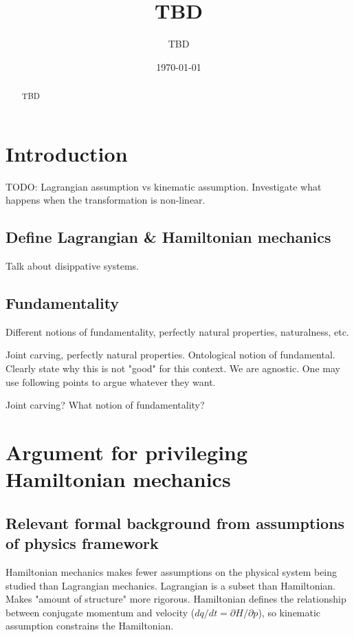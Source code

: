 \documentclass[letterpaper]{article}
\begin{document}
\title{TBD}
\author{TBD}

\date{\today}

\maketitle

\begin{abstract}
	TBD
\end{abstract}


\section{Introduction}


TODO: Lagrangian assumption vs kinematic assumption. Investigate what happens when the transformation is non-linear.

\subsection{Define Lagrangian \& Hamiltonian mechanics}

Talk about disippative systems.

\subsection{Fundamentality}

Different notions of fundamentality, perfectly natural properties, naturalness, etc. 

Joint carving, perfectly natural properties. Ontological notion of fundamental. Clearly state why this is not "good" for this context. We are agnostic. One may use following points to argue whatever they want.

Joint carving? What notion of fundamentality? 

\section{Argument for privileging Hamiltonian mechanics}

\subsection{Relevant formal background from assumptions of physics framework}

Hamiltonian mechanics makes fewer assumptions on the physical system being studied than Lagrangian mechanics. Lagrangian is a subset than Hamiltonian. Makes "amount of structure" more rigorous. Hamiltonian defines the relationship between conjugate momentum and velocity ($dq/dt = \partial H / \partial p$), so kinematic assumption constrains the Hamiltonian.
\end{document}
